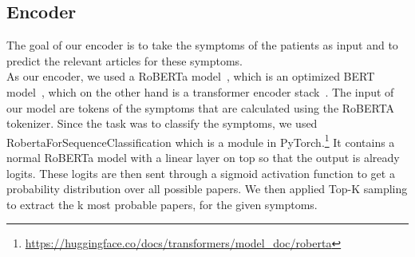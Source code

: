 \subsection{Encoder}
The goal of our encoder is to take the symptoms of the patients as input and to predict the relevant articles for these symptoms.\\
As our encoder, we used a RoBERTa model~\cite{liu2019robertarobustlyoptimizedbert}, which is an optimized BERT model~\cite{devlin2018bert}, which on the other hand is a transformer encoder stack~\cite{vaswani2017attention}. The input of our model are tokens of the symptoms that are calculated using the RoBERTA tokenizer. Since the task was to classify the symptoms, we used RobertaForSequenceClassification which is a module in PyTorch.\footnote{\url{https://huggingface.co/docs/transformers/model_doc/roberta}} It contains a normal RoBERTa model with a linear layer on top so that the output is already logits. These logits are then sent through a sigmoid activation function to get a probability distribution over all possible papers. We then applied Top-K sampling to extract the k most probable papers, for the given symptoms.

